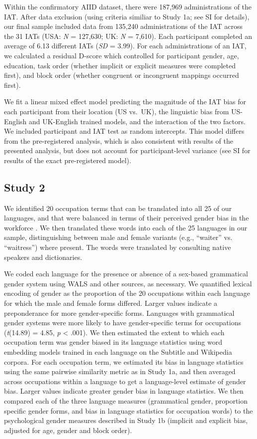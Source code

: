\documentclass[9pt,twocolumn,twoside]{pnas-new}
\begin{document}
{Within the confirmatory AIID dataset, there were 187,969 administrations
of the IAT. After data exclusion (using criteria similiar to Study 1a; see SI for details), our final sample
included data from 135,240 administrations of the IAT across the 31 IATs (USA: \emph{N} = 127,630; UK: \emph{N} = 7,610). Each participant
completed an average of 6.13 different IATs (\emph{SD} = 3.99). For each administrations of an IAT, we calculated a residual D-score which controlled for participant gender, age, education, task order (whether implicit or explicit measures were completed first), and block order (whether congruent or incongruent mappings occurred first).

We fit a linear mixed effect model predicting the magnitude of the IAT bias for each participant from their location (US vs.\ UK), the linguistic bias from US-English and UK-English trained models, and the interaction of the two factors. We included participant and IAT test as random intercepts. This model differs from the pre-registered analysis, which is also consistent with results of the presented analysis, but does not account for participant-level variance (see SI for results of the exact pre-registered model).


\subsection*{Study 2}

We identified 20 occupation terms that can be translated into  all 25 of our languages, and that were balanced in terms of
their perceived gender bias in the workforce \cite{misersky2014norms}. We
then translated these words into each of the 25 languages in our sample,
distinguishing between male and female variants (e.g., \enquote{waiter}
vs. \enquote{waitress}) where present. The words were translated by
consulting native speakers and dictionaries.

We coded each language for the presence or absence of a sex-based
grammatical gender system using WALS \cite{wals} and
other sources, as necessary. We quantified lexical encoding of gender as the proportion of the 20 occupations within each language for which the male and female forms differed. Larger values indicate a preponderance for more gender-specific forms.  Languages with grammatical gender
systems were more likely to have gender-specific terms for occupations
(\emph{t}(14.89) = 4.85, \emph{p} \textless{} .001). We then estimated the extent to which each occupation term was gender biased in its language statistics using word
embedding models trained in each language on the Subtitle and Wikipedia
corpora. For each occupation term, we estimated its bias in language
statistics using the same pairwise similarity metric as in Study 1a, and
then averaged across occupations within a language to get a
language-level estimate of gender bias. Larger values indicate greater
gender bias in language statistics. We then compared each of the three
language measures (grammatical gender, proportion specific gender forms,
and bias in language statistics for occupation words) to the
psychological gender measures described in Study 1b (implicit and
explicit bias, adjusted for age, gender and block order).

}

\showmatmethods{} %

\showacknow{} %


\end{document}

